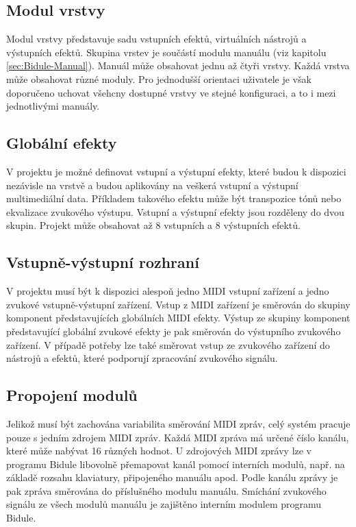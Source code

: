 \documentclass[thesis=M,czech]{FITthesis}[2019/03/06]
\begin{document}
		\subsection{Modul vrstvy}\label{sec:Bidule-Layer}
			Modul vrstvy představuje sadu vstupních efektů, virtuálních nástrojů a výstupních efektů.
			Skupina vrstev je součástí modulu manuálu (viz kapitolu \ref{sec:Bidule-Manual}).
			Manuál může obsahovat jednu až čtyři vrstvy.
			Každá vrstva může obsahovat různé moduly. Pro jednodušší orientaci uživatele je však doporučeno
			uchovat všehcny dostupné vrstvy ve stejné konfiguraci, a to i mezi jednotlivými manuály.
			
		\subsection{Globální efekty}
			V projektu je možné definovat vstupní a výstupní efekty, které budou k dispozici nezávisle na vrstvě
			a budou aplikovány na veškerá vstupní a výstupní multimediální data. Příkladem takového efektu může být
			transpozice tónů nebo ekvalizace zvukového výstupu. Vstupní a výstupní efekty jsou rozděleny do dvou skupin.
			Projekt může obsahovat až 8 vstupních a 8 výstupních efektů.

		\subsection{Vstupně-výstupní rozhraní}
			V projektu musí být k dispozici alespoň jedno MIDI vstupní zařízení a jedno zvukové vstupně-výstupní zařízení.
			Vstup z MIDI zařízení je směrován do skupiny komponent představujících globálních MIDI efekty.
			Výstup ze skupiny komponent představující globální zvukové efekty je pak směrován do výstupního zvukového zařízení.
			V případě potřeby lze také směrovat vstup ze zvukového zařízení do nástrojů a efektů, které podporují zpracování
			zvukového signálu.
			
		\subsection{Propojení modulů}
			Jelikož musí být zachována variabilita směrování MIDI zpráv, celý systém pracuje pouze s jedním zdrojem MIDI zpráv.
			Každá MIDI zpráva má určené číslo kanálu, které může nabývat 16 různých hodnot.
			U zdrojových MIDI zprávy lze v programu Bidule libovolně přemapovat kanál pomocí interních modulů, např. na základě rozsahu klaviatury, připojeného manuálu apod.
			Podle kanálu zprávy je pak zpráva směrována do příslušného modulu manuálu. Smíchání zvukového signálu ze všech modulů manuálu je zajištěno interním modulem programu Bidule.
	
\end{document}
